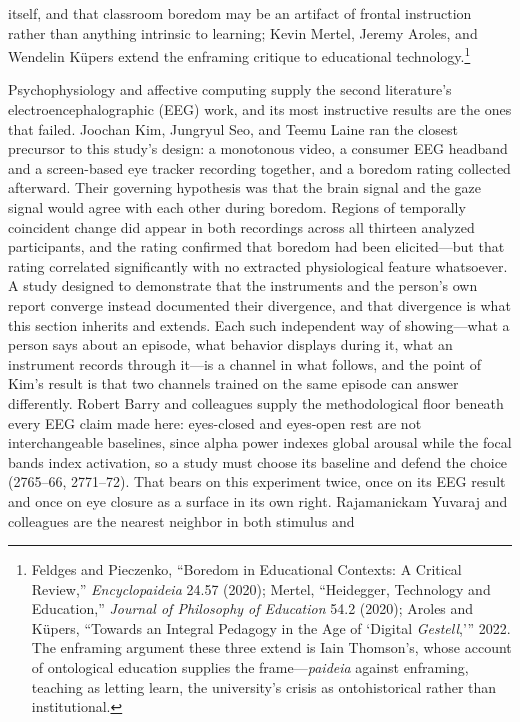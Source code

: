itself, and that classroom boredom may be an artifact of frontal instruction rather than
anything intrinsic to learning; Kevin Mertel, Jeremy Aroles, and Wendelin Küpers extend the
enframing critique to educational technology.\footnote{Feldges and Pieczenko, ``Boredom in
Educational Contexts: A Critical Review,'' \textit{Encyclopaideia} 24.57 (2020); Mertel,
``Heidegger, Technology and Education,'' \textit{Journal of Philosophy of Education} 54.2
(2020); Aroles and K\"upers, ``Towards an Integral Pedagogy in the Age of `Digital
\textit{Gestell},''' 2022. The enframing argument these three extend is Iain Thomson's, whose
account of ontological education supplies the frame---\textit{paideia} against enframing,
teaching as letting learn, the university's crisis as ontohistorical rather than
institutional.}

Psychophysiology and affective computing supply the second literature's electroencephalographic
(EEG) work, and its most instructive results are the ones that failed. Joochan Kim, Jungryul Seo,
and Teemu Laine ran the closest precursor to this study's design: a monotonous video, a
consumer EEG headband and a screen-based eye tracker recording together, and a boredom rating
collected afterward. Their governing hypothesis was that the brain signal and the gaze signal
would agree with each other during boredom. Regions of temporally coincident change did appear
in both recordings across all thirteen analyzed participants, and the rating confirmed that
boredom had been elicited---but that rating correlated significantly with no extracted
physiological feature whatsoever. A study designed to demonstrate that the instruments and the
person's own report converge instead documented their divergence, and that divergence is what
this section inherits and extends. Each such independent way of showing---what a person says
about an episode, what behavior displays during it, what an instrument records through it---is
a channel in what follows, and the point of Kim's result is that two channels trained on the
same episode can answer differently. Robert Barry and colleagues supply the methodological
floor beneath every EEG claim made here: eyes-closed and eyes-open rest are not interchangeable
baselines, since alpha power indexes global arousal while the focal bands index activation, so
a study must choose its baseline and defend the choice (2765--66, 2771--72). That bears on
this experiment twice, once on its EEG result and once on eye closure as a surface in its own
right. Rajamanickam Yuvaraj and colleagues are the nearest neighbor in both stimulus and
